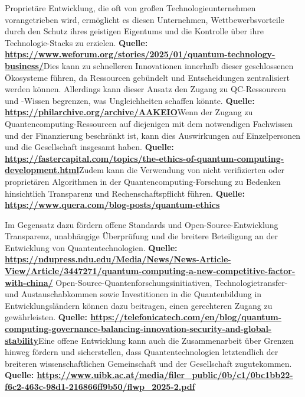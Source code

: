 Proprietäre Entwicklung, die oft von großen Technologieunternehmen vorangetrieben wird, ermöglicht es diesen Unternehmen, Wettbewerbsvorteile durch den Schutz ihres geistigen Eigentums und die Kontrolle über ihre Technologie-Stacks zu erzielen.  \textbf{Quelle: \href{https://www.weforum.org/stories/2025/01/quantum-technology-business/}{https://www.weforum.org/stories/2025/01/quantum-technology-business/}}Dies kann zu schnelleren Innovationen innerhalb dieser geschlossenen Ökosysteme führen, da Ressourcen gebündelt und Entscheidungen zentralisiert werden können. Allerdings kann dieser Ansatz den Zugang zu QC-Ressourcen und -Wissen begrenzen, was Ungleichheiten schaffen könnte. \textbf{Quelle: \href{https://philarchive.org/archive/AAKEIO}{https://philarchive.org/archive/AAKEIO}}Wenn der Zugang zu Quantencomputing-Ressourcen auf diejenigen mit dem notwendigen Fachwissen und der Finanzierung beschränkt ist, kann dies Auswirkungen auf Einzelpersonen und die Gesellschaft insgesamt haben. \textbf{Quelle: \href{https://fastercapital.com/topics/the-ethics-of-quantum-computing-development.html}{https://fastercapital.com/topics/the-ethics-of-quantum-computing-development.html}}Zudem kann die Verwendung von nicht verifizierten oder proprietären Algorithmen in der Quantencomputing-Forschung zu Bedenken hinsichtlich Transparenz und Rechenschaftspflicht führen. \textbf{Quelle: \href{https://www.quera.com/blog-posts/quantum-ethics}{https://www.quera.com/blog-posts/quantum-ethics}}

Im Gegensatz dazu fördern offene Standards und Open-Source-Entwicklung Transparenz, unabhängige Überprüfung und die breitere Beteiligung an der Entwicklung von Quantentechnologien. \textbf{Quelle: \href{https://ndupress.ndu.edu/Media/News/News-Article-View/Article/3447271/quantum-computing-a-new-competitive-factor-with-china/}{https://ndupress.ndu.edu/Media/News/News-Article-View/Article/3447271/quantum-computing-a-new-competitive-factor-with-china/}} Open-Source-Quantenforschungsinitiativen, Technologietransfer- und Austauschabkommen sowie Investitionen in die Quantenbildung in Entwicklungsländern können dazu beitragen, einen gerechteren Zugang zu gewährleisten. \textbf{Quelle: \href{https://telefonicatech.com/en/blog/quantum-computing-governance-balancing-innovation-security-and-global-stability}{https://telefonicatech.com/en/blog/quantum-computing-governance-balancing-innovation-security-and-global-stability}}Eine offene Entwicklung kann auch die Zusammenarbeit über Grenzen hinweg fördern und sicherstellen, dass Quantentechnologien letztendlich der breiteren wissenschaftlichen Gemeinschaft und der Gesellschaft zugutekommen. \textbf{Quelle: \href{https://www.uibk.ac.at/media/filer_public/0b/c1/0bc1bb22-f6c2-463c-98d1-216866ff9b50/flwp_2025-2.pdf}{https://www.uibk.ac.at/media/filer\_public/0b/c1/0bc1bb22-f6c2-463c-98d1-216866ff9b50/flwp\_2025-2.pdf}}


